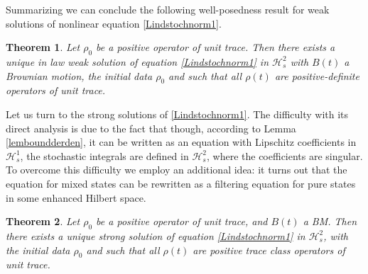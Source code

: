 \documentclass[12pt]{article}
\def\HC{\mathcal{H}}
\newtheorem{theorem}{Theorem}[section]
\begin{document}
Summarizing we can conclude the following well-posedness
result for weak solutions of nonlinear equation \eqref{Lindstochnorm1}.

\begin{theorem}
\label{LindStochnonLin}
Let $\rho_0$ be a positive operator of unit trace.
Then there exists a unique in law weak solution of equation \eqref{Lindstochnorm1} in $\HC^2_s$
with $B(t)$ a Brownian motion, the initial data $\rho_0$ and such that all $\rho(t)$
are positive-definite operators of unit trace.
\end{theorem}

Let us turn to the strong solutions of \eqref{Lindstochnorm1}. The difficulty with its direct analysis
is due to the fact that though, according to Lemma \ref{lemboundderden}, it can be written
as an equation with Lipschitz coefficients in $\HC^1_s$, the stochastic integrals are defined in $\HC^2_s$,
where the coefficients are singular.
To overcome this difficulty we employ an additional idea:
it turns out that the equation for mixed states can be rewritten as a filtering equation for pure
 states in some enhanced Hilbert space.

 \begin{theorem}
\label{LindStochnonLin1}
Let $\rho_0$ be a positive operator of unit trace,
and $B(t)$ a BM. Then there exists a unique strong solution of equation
\eqref{Lindstochnorm1} in $\HC^2_s$, with the initial data $\rho_0$
and such that all $\rho(t)$ are positive trace class operators of unit trace.
\end{theorem}
\end{document}
